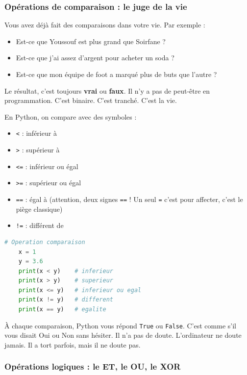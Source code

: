\documentclass[12pt,a4paper]{article}
\begin{document}
\subsubsection{Opérations de comparaison : le juge de la vie}

Vous avez déjà fait des comparaisons dans votre vie. Par exemple :

\begin{itemize}
	\item \og Est-ce que Youssouf est plus grand que Soirfane ? \fg
	\item \og Est-ce que j'ai assez d'argent pour acheter un soda ? \fg
	\item \og Est-ce que mon équipe de foot a marqué plus de buts que l'autre ? \fg
\end{itemize}

Le résultat, c'est toujours \textbf{vrai} ou \textbf{faux}. Il n'y a pas de \og peut-être \fg en programmation. C'est binaire. C'est tranché. C'est la vie.

En Python, on compare avec des symboles :

\begin{itemize}
	\item [\ding{182}] \texttt{<} : inférieur à
	\item [\ding{183}] \texttt{>} : supérieur à
	\item [\ding{184}] \texttt{<=} : inférieur ou égal
	\item [\ding{185}] \texttt{>=} : supérieur ou égal
	\item [\ding{186}] \texttt{==} : égal à (attention, deux signes \texttt{==} ! Un seul \texttt{=} c'est pour affecter, c'est le piège classique)
	\item [\ding{187}] \texttt{!=} : différent de
\end{itemize}

\begin{lstlisting}[language=Python]
	# Operation comparaison
	x = 1
	y = 3.6
	print(x < y)    # inferieur
	print(x > y)    # superieur
	print(x <= y)   # inferieur ou egal
	print(x != y)   # different
	print(x == y)   # egalite
\end{lstlisting}

À chaque comparaison, Python vous répond \texttt{True} ou \texttt{False}. C'est comme s'il vous disait \og Oui \fg ou \og Non \fg sans hésiter. Il n'a pas de doute. L'ordinateur ne doute jamais. Il a tort parfois, mais il ne doute pas.

\subsubsection{Opérations logiques : le ET, le OU, le XOR}
\end{document}
